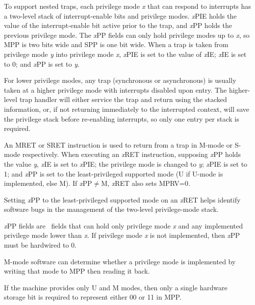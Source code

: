 To support nested traps, each privilege mode {\em x} that can respond to
interrupts has a two-level
stack of interrupt-enable bits and privilege modes.  {\em x}\/PIE
holds the value of the interrupt-enable bit active prior to the trap,
and {\em x}\/PP holds the previous privilege mode.  The {\em x}\/PP
fields can only hold privilege modes up to {\em x}, so MPP is
two bits wide and SPP is one bit wide.  When
a trap is taken from privilege mode {\em y} into privilege mode {\em
  x}, {\em x}\/PIE is set to the value of {\em x}\/IE; {\em x}\/IE is set to
0; and {\em x}\/PP is set to {\em y}.

\begin{commentary}
For lower privilege modes, any trap (synchronous or asynchronous) is
usually taken at a higher privilege mode with interrupts disabled upon entry.
The higher-level trap handler will either service the trap and return
using the stacked information, or, if not returning immediately to the
interrupted context, will save the privilege stack before re-enabling
interrupts, so only one entry per stack is required.
\end{commentary}

An MRET or SRET instruction is used to return from
a trap in M-mode or S-mode respectively.  When
executing an {\em x}\/RET instruction, supposing {\em x}\/PP holds the
value {\em y}, {\em x}\/IE is set to {\em x}\/PIE; the privilege mode
is changed to {\em y}; {\em x}\/PIE is set to 1; and {\em x}\/PP is
set to the least-privileged supported mode (U if U-mode is implemented, else M).
If {\em x}\/PP$\neq$M, {\em x}\/RET also sets MPRV=0.

\begin{commentary}
Setting {\em x}\/PP to the least-privileged supported mode on an {\em x}\/RET
helps identify software bugs in the management of the two-level privilege-mode
stack.
\end{commentary}

{\em x}\/PP fields are \warl\ fields that can hold only privilege mode {\em x}
and any implemented privilege mode lower than {\em x}.  If privilege mode {\em
x} is not implemented, then {\em x}\/PP must be hardwired to 0.

\begin{commentary}
M-mode software can determine whether a privilege mode is implemented
by writing that mode to MPP then reading it back.

If the machine provides only U and M modes, then only a single
hardware storage bit is required to represent either 00 or 11 in MPP.
\end{commentary}

